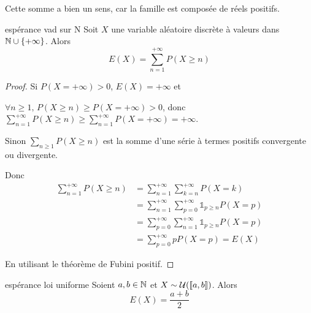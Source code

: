 \begin{remarque}
    Cette somme a bien un sens, car la famille est composée de réels positifs.
\end{remarque}

\begin{proposition}{espérance vad sur N }{}
    Soit $X$ une variable aléatoire discrète à valeurs dans $\mathbb{N} \cup \{+\infty\}$. Alors
    $$ E(X) = \sum_{n = 1}^{+ \infty} P(X \geqslant n) $$
\end{proposition}

\begin{proof}
    Si $P(X = + \infty) >0$, $E(X) = + \infty$ et

    $\forall n \geqslant 1, \, P(X \geqslant n) \geqslant P(X = + \infty) > 0$, donc
    $\displaystyle \sum_{n = 1}^{+ \infty} P(X \geqslant n) \geqslant \sum_{n = 1}^{+ \infty} P(X = + \infty) = + \infty$.

    \avspace Sinon $\sum_{n \geqslant 1} P(X \geqslant n)$ est la somme d'une série à termes positifs
    convergente ou divergente.

    Donc 
    \begin{align}
        \sum_{n = 1}^{+ \infty} P(X \geqslant n) & = \sum_{n = 1}^{+ \infty} \sum_{k = n}^{+ \infty} P(X = k) \\
        & = \sum_{n = 1}^{+ \infty} \sum_{p = 0}^{+ \infty} \mathbb 1_{p \geqslant n} P(X = p) \\
        & = \sum_{p = 0}^{+ \infty} \sum_{n = 1}^{+ \infty} \mathbb 1_{p \geqslant n} P(X = p) \\
        & = \sum_{p = 0}^{+ \infty} p P(X = p) = E(X)
    \end{align}

    En utilisant le théorème de Fubini positif. 

\end{proof}

\begin{proposition}{espérance loi uniforme}{}
    Soient $a, b \in \mathbb{N}$ et $X \sim \mathcal U([\![a, b]\!])$. Alors
    $$ E(X) = \frac{a + b}{2} $$
\end{proposition}

